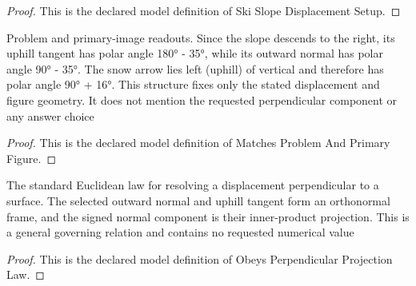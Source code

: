\begin{proof}
  This is the declared model definition of Ski Slope Displacement Setup.
\end{proof}
\begin{definition}
  \label{def:physics:phyx-mini-0678:phyxminiproblems-problemphyxmini0678-matchesproblemandprimaryfigure}
  Problem and primary-image readouts. Since the slope descends to the right, its uphill tangent has polar angle 180° - 35°, while its outward normal has polar angle 90° - 35°. The snow arrow lies left (uphill) of vertical and therefore has polar angle 90° + 16°. This structure fixes only the stated displacement and figure geometry. It does not mention the requested perpendicular component or any answer choice
\end{definition}
\begin{proof}
  This is the declared model definition of Matches Problem And Primary Figure.
\end{proof}
\begin{definition}
  \label{def:physics:phyx-mini-0678:phyxminiproblems-problemphyxmini0678-obeysperpendicularprojectionlaw}
  The standard Euclidean law for resolving a displacement perpendicular to a surface. The selected outward normal and uphill tangent form an orthonormal frame, and the signed normal component is their inner-product projection. This is a general governing relation and contains no requested numerical value
\end{definition}
\begin{proof}
  This is the declared model definition of Obeys Perpendicular Projection Law.
\end{proof}
